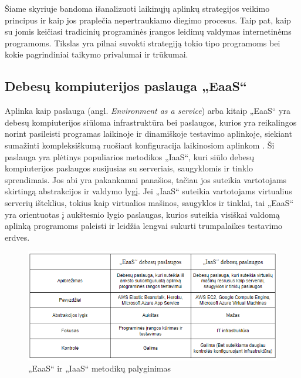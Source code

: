 \documentclass{VUMIFPSkursinis}
\begin{document}
Šiame skyriuje bandoma išanalizuoti laikinųjų aplinkų strategijos veikimo principus ir kaip jos praplečia nepertraukiamo diegimo procesus. Taip pat, kaip su jomis keičiasi tradicinių programinės įrangos leidimų valdymas internetinėms programoms. Tikslas yra pilnai suvokti strategiją tokio tipo programoms bei kokie pagrindiniai taikymo privalumai ir trūkumai.

\subsection{Debesų kompiuterijos paslauga „EaaS“}

Aplinka kaip paslauga (angl. \textit{Environment as a service}) arba kitaip 
„EaaS“ yra debesų kompiuterijos siūloma infrastruktūra bei paslaugos, kurios yra reikalingos norint pasileisti programas laikinoje ir dinamiškoje testavimo aplinkoje, siekiant sumažinti kompleksiškumą ruošiant konfiguracija laikinosiom aplinkom \cite{SaltTryliktas}. Ši paslauga yra plėtinys populiarios metodikos „IaaS“, kuri siūlo debesų kompiuterijos paslaugos susijusias su serveriais, saugyklomis ir tinklo sprendimais. Jos abi yra pakankamai panašios, tačiau jos suteikia vartotojams skirtingą abstrakcijos ir valdymo lygį. Jei „IaaS“ suteikia vartotojams virtualius serverių išteklius, tokius kaip virtualios mašinos, saugyklos ir tinklai, tai „EaaS“ yra orientuotas į aukštesnio lygio paslaugas, kurios suteikia visiškai valdomą aplinką programoms paleisti ir leidžia lengvai sukurti trumpalaikes testavimo erdves.

\begin{figure}[H]
    \centering
    \includegraphics[scale=0.9]{img/EassvsIaas.png}
    \caption{„EaaS“ ir „IaaS“ metodikų palyginimas}
    \label{img:mlp}
\end{figure}

\end{document}
